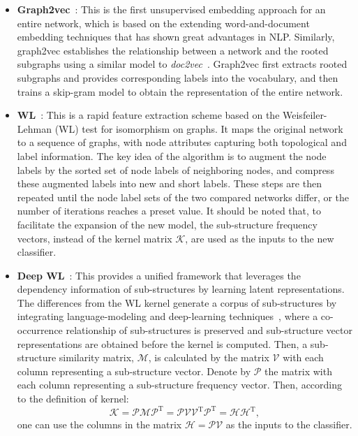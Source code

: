 \documentclass[10pt,journal,compsoc]{IEEEtran}
\begin{document}
\begin{itemize}


\item \textbf{Graph2vec}~\cite{narayanan2017graph2vec}: This is the first unsupervised embedding approach for an entire network, which is based on the extending word-and-document embedding techniques that has shown great advantages in NLP. Similarly, graph2vec establishes the relationship between a network and the rooted subgraphs using a similar model to \emph{doc2vec}~\cite{le2014distributed}. Graph2vec first extracts rooted subgraphs and provides corresponding labels into the vocabulary, and then trains a skip-gram model to obtain the representation of the entire network.

\item \textbf{WL}~\cite{shervashidze2011weisfeiler}: This is a rapid feature extraction scheme based on the Weisfeiler-Lehman (WL) test for isomorphism on graphs. It maps the original network to a sequence of graphs, with node attributes capturing both topological and label information. The key idea of the algorithm is to augment the node labels by the sorted set of node labels of neighboring nodes, and compress these augmented labels into new and short labels. These steps are then repeated until the node label sets of the two compared networks differ, or the number of iterations reaches a preset value. It should be noted that, to facilitate the expansion of the new model, the sub-structure frequency vectors, instead of the kernel matrix $\mathcal{K}$, are used as the inputs to the new classifier.

\item \textbf{Deep WL}~\cite{yanardag2015deep}: This provides a unified framework that leverages the dependency information of sub-structures by learning latent representations. The differences from the WL kernel generate a corpus of sub-structures by integrating language-modeling and deep-learning techniques~\cite{bengio2003neural}, where a co-occurrence relationship of sub-structures is preserved and sub-structure vector representations are obtained before the kernel is computed. Then, a sub-structure similarity matrix, $\mathcal{M}$, is calculated by the matrix $\mathcal{V}$ with each column representing a sub-structure vector. Denote by $\mathcal{P}$ the matrix with each column representing a sub-structure frequency vector. Then, according to the definition of kernel:
\begin{equation}
\mathcal{K} = \mathcal{P}\mathcal{M}\mathcal{P}^\mathrm{T} = \mathcal{P}\mathcal{V}\mathcal{V}^\mathrm{T}\mathcal{P}^\mathrm{T}=\mathcal{H}\mathcal{H}^\mathrm{T},
\end{equation}
one can use the columns in the matrix $\mathcal{H}=\mathcal{P}\mathcal{V}$ as the inputs to the classifier.


\end{itemize}
\end{document}
